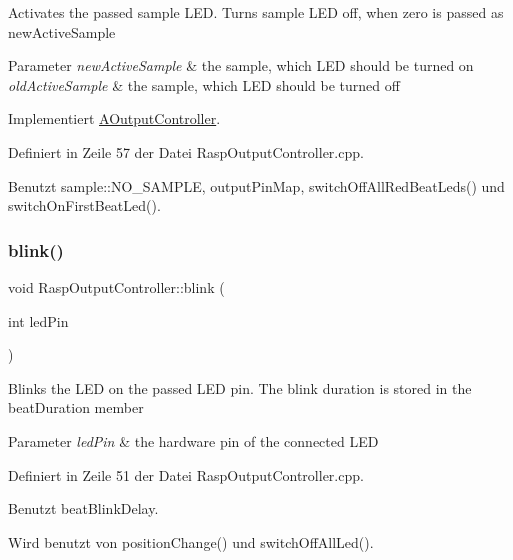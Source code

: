Activates the passed sample L\+ED. Turns sample L\+ED off, when zero is passed as new\+Active\+Sample 
\begin{DoxyParams}{Parameter}
{\em new\+Active\+Sample} & the sample, which L\+ED should be turned on \\
\hline
{\em old\+Active\+Sample} & the sample, which L\+ED should be turned off \\
\hline
\end{DoxyParams}


Implementiert \hyperlink{class_a_output_controller_ac2b87aa6291c38cc65185bf6a37ae300}{A\+Output\+Controller}.



Definiert in Zeile 57 der Datei Rasp\+Output\+Controller.\+cpp.



Benutzt sample\+::\+N\+O\+\_\+\+S\+A\+M\+P\+LE, output\+Pin\+Map, switch\+Off\+All\+Red\+Beat\+Leds() und switch\+On\+First\+Beat\+Led().

\mbox{\label{class_rasp_output_controller_a23987d33142c3c09abf8126773f32d99}} 
\subsubsection{\texorpdfstring{blink()}{blink()}}
{\footnotesize\ttfamily void Rasp\+Output\+Controller\+::blink (\begin{DoxyParamCaption}\item[{int}]{led\+Pin }\end{DoxyParamCaption})}

Blinks the L\+ED on the passed L\+ED pin. The blink duration is stored in the beat\+Duration member 
\begin{DoxyParams}{Parameter}
{\em led\+Pin} & the hardware pin of the connected L\+ED \\
\hline
\end{DoxyParams}


Definiert in Zeile 51 der Datei Rasp\+Output\+Controller.\+cpp.



Benutzt beat\+Blink\+Delay.



Wird benutzt von position\+Change() und switch\+Off\+All\+Led().

\mbox{\label{class_rasp_output_controller_a1172c2966777bbcee89cbe4e6de027d5}} 
